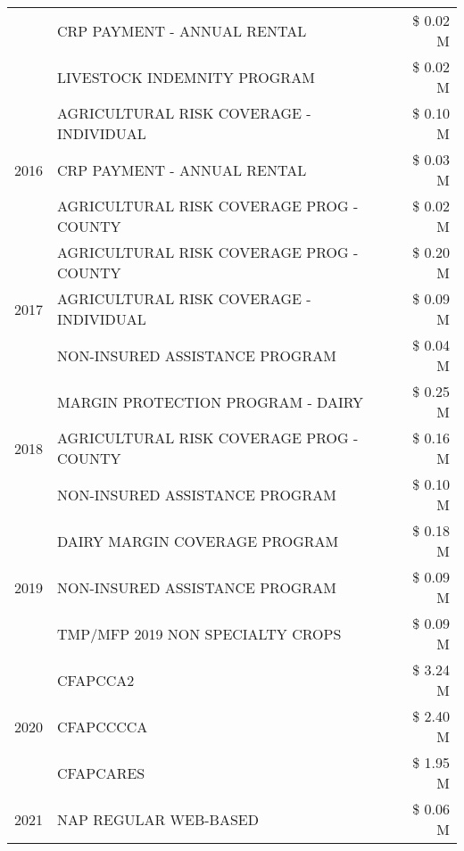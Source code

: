 \begin{tabular}{llr}
 & CRP PAYMENT - ANNUAL RENTAL & \$ 0.02 M \\
 & LIVESTOCK INDEMNITY PROGRAM & \$ 0.02 M \\
\cline{1-3}
\multirow[t]{3}{*}{2016} & AGRICULTURAL RISK COVERAGE - INDIVIDUAL & \$ 0.10 M \\
 & CRP PAYMENT - ANNUAL RENTAL & \$ 0.03 M \\
 & AGRICULTURAL RISK COVERAGE PROG - COUNTY & \$ 0.02 M \\
\cline{1-3}
\multirow[t]{3}{*}{2017} & AGRICULTURAL RISK COVERAGE PROG - COUNTY & \$ 0.20 M \\
 & AGRICULTURAL RISK COVERAGE - INDIVIDUAL & \$ 0.09 M \\
 & NON-INSURED ASSISTANCE PROGRAM & \$ 0.04 M \\
\cline{1-3}
\multirow[t]{3}{*}{2018} & MARGIN PROTECTION PROGRAM - DAIRY & \$ 0.25 M \\
 & AGRICULTURAL RISK COVERAGE PROG - COUNTY & \$ 0.16 M \\
 & NON-INSURED ASSISTANCE PROGRAM & \$ 0.10 M \\
\cline{1-3}
\multirow[t]{3}{*}{2019} & DAIRY MARGIN COVERAGE PROGRAM & \$ 0.18 M \\
 & NON-INSURED ASSISTANCE PROGRAM & \$ 0.09 M \\
 & TMP/MFP 2019 NON SPECIALTY CROPS & \$ 0.09 M \\
\cline{1-3}
\multirow[t]{3}{*}{2020} & CFAPCCA2 & \$ 3.24 M \\
 & CFAPCCCCA & \$ 2.40 M \\
 & CFAPCARES & \$ 1.95 M \\
\cline{1-3}
2021 & NAP REGULAR WEB-BASED & \$ 0.06 M \\
\cline{1-3}
\bottomrule
\end{tabular}
